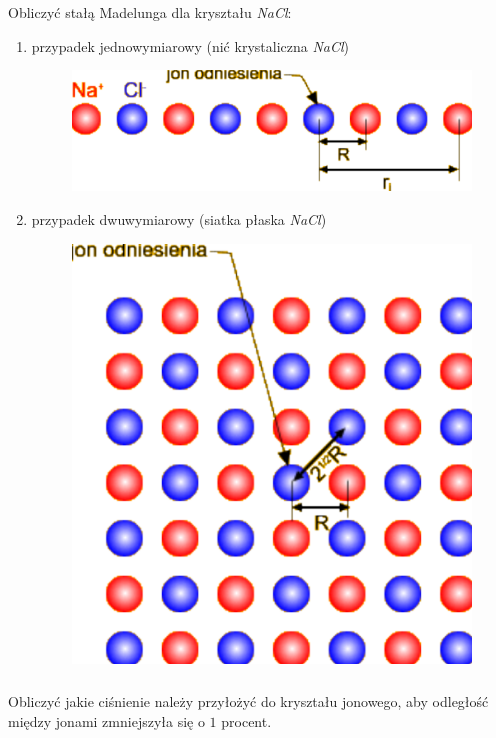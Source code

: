 \subsubsection{}
Obliczyć stałą Madelunga dla kryształu \textit{NaCl}:
\begin{enumerate}
\item przypadek jednowymiarowy (nić krystaliczna \textit{NaCl})
\begin{figure}[h!]
\centering
\includegraphics[scale=0.3]{images/zes2-1}
\end{figure}
\item przypadek dwuwymiarowy (siatka płaska \textit{NaCl})
\begin{figure}[h!]
\centering
\includegraphics[scale=0.2]{images/zes2-2}
\end{figure}
\end{enumerate}

\subsubsection{}
Obliczyć jakie ciśnienie należy przyłożyć do kryształu jonowego, aby odległość między jonami zmniejszyła się o $1$ procent.

